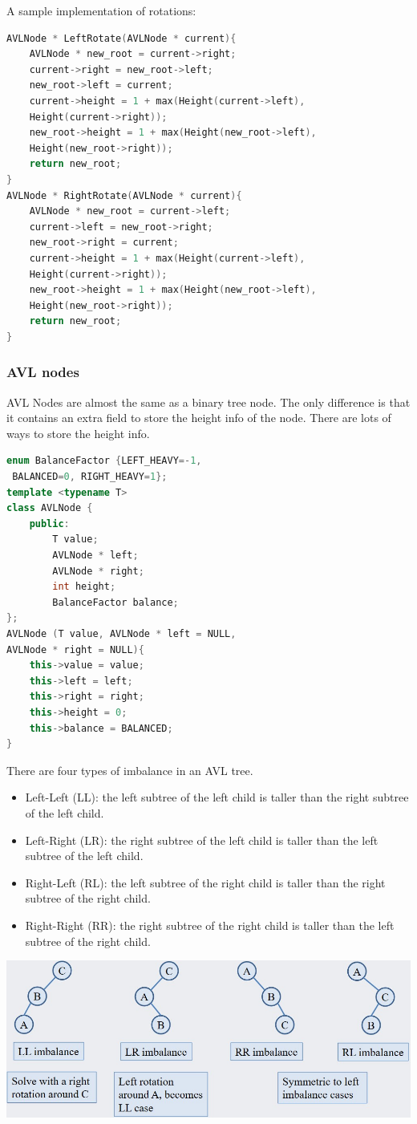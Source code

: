 \documentclass[letterpaper,12pt]{article}
\begin{document}
A sample implementation of rotations:\begin{lstlisting}[language=C++]
AVLNode * LeftRotate(AVLNode * current){
    AVLNode * new_root = current->right;
    current->right = new_root->left;
    new_root->left = current;
    current->height = 1 + max(Height(current->left), 
    Height(current->right));
    new_root->height = 1 + max(Height(new_root->left), 
    Height(new_root->right));
    return new_root;
}
AVLNode * RightRotate(AVLNode * current){
    AVLNode * new_root = current->left;
    current->left = new_root->right;
    new_root->right = current;
    current->height = 1 + max(Height(current->left), 
    Height(current->right));
    new_root->height = 1 + max(Height(new_root->left), 
    Height(new_root->right));
    return new_root;
}
    \end{lstlisting}
\subsubsection{AVL nodes}
AVL Nodes are almost the same as a binary tree node. The only difference is that it contains an extra field to store the height info of the node. There are lots of ways to store the height info.
\begin{lstlisting}[language=C++]
enum BalanceFactor {LEFT_HEAVY=-1,
 BALANCED=0, RIGHT_HEAVY=1};
template <typename T>
class AVLNode {
    public:
        T value;
        AVLNode * left;
        AVLNode * right;
        int height;
        BalanceFactor balance;
};
AVLNode (T value, AVLNode * left = NULL, 
AVLNode * right = NULL){
    this->value = value;
    this->left = left;
    this->right = right;
    this->height = 0;
    this->balance = BALANCED;
}
\end{lstlisting}
There are four types of imbalance in an AVL tree. \begin{itemize}
    \item Left-Left (LL): the left subtree of the left child is taller than the right subtree of the left child.
    \item Left-Right (LR): the right subtree of the left child is taller than the left subtree of the left child.
    \item Right-Left (RL): the left subtree of the right child is taller than the right subtree of the right child.
    \item Right-Right (RR): the right subtree of the right child is taller than the left subtree of the right child.
\end{itemize}
\includegraphics*[scale = 0.5]{./Images/Type of imbalance.jpg}
\end{document}
